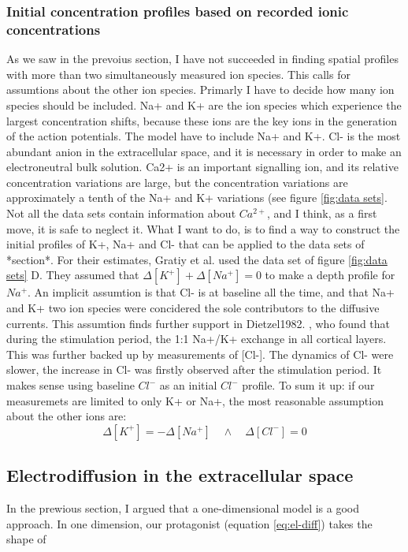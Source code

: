 \documentclass{article}
\begin{document}
\subsubsection{Initial concentration profiles based on recorded ionic concentrations}
As we saw in the prevoius section, I have not succeeded in finding spatial profiles with more than two simultaneously measured ion species. This calls for assumtions about the other ion species. Primarly I have to decide how many ion species should be included. Na+ and K+ are the ion species which experience the largest concentration shifts, because these ions are the key ions in the generation of the action potentials. The model have to include Na+ and K+. Cl- is the most abundant anion in the extracellular space, and it is necessary in order to make an electroneutral bulk solution. Ca2+ is an important signalling ion, and its relative concentration variations are large, but the concentration variations are approximately a tenth of the Na+ and K+ variations (see figure \ref{fig:data sets}. Not all the data sets contain information about $Ca^{2+}$, and I think, as a first move, it is safe to neglect it. What I want to do, is to find a way to construct the initial profiles of K+, Na+ and Cl- that can be applied to the data sets of *section*. For their estimates, Gratiy et al. used the data set of figure \ref{fig:data sets} D. They assumed that $\Delta [K^+] + \Delta [Na^+] = 0$ to make a depth profile for $Na^+$. An implicit assumtion is that Cl- is at baseline all the time, and that Na+ and K+ two ion species were concidered the sole contributors to the diffusive currents. This assumtion finds further support in Dietzel1982. , who found that during the stimulation period, the 1:1 Na+/K+ exchange in all cortical layers. This was further backed up by measurements of [Cl-]. The dynamics of Cl- were slower, the increase in Cl- was firstly observed after the stimulation period. It makes sense using baseline $Cl^-$ as an initial $Cl^-$ profile. 
To sum it up: if our measuremets are limited to only K+ or Na+, the most reasonable assumption about the other ions are:
 $$\Delta [K^+] =  -\Delta [Na^+] \quad \land \quad \Delta [Cl^-] =0$$ 


\subsection{Electrodiffusion in the extracellular space}
In the prewious section, I argued that a one-dimensional model is a good approach. 
In one dimension, our protagonist (equation \ref{eq:el-diff}) takes the shape of 
\end{document}
